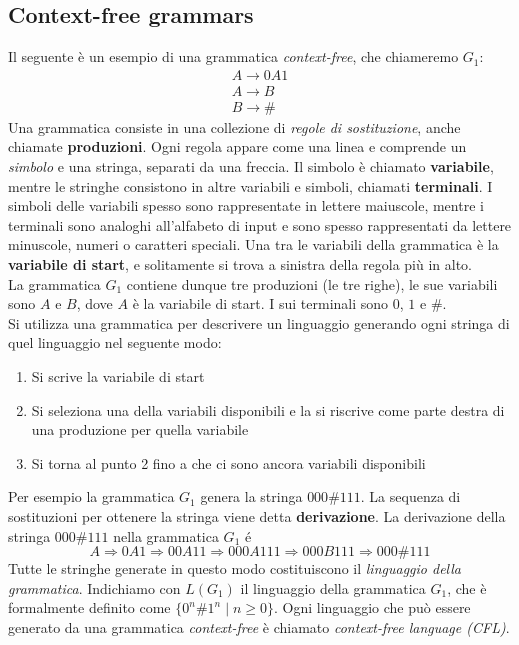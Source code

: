 \documentclass[italian]{article}
\newcommand{\taleche}{\;|\;}
\begin{document}
\subsection{Context-free grammars}
Il seguente è un esempio di una grammatica \textit{context-free}, che chiameremo $G_1$:
\begin{gather*}
	A \to 0A1 \\
	A \to B \\
	B \to \#
\end{gather*}
Una grammatica consiste in una collezione di \textit{regole di sostituzione}, anche chiamate \textbf{produzioni}. Ogni regola appare come una linea e comprende un \textit{simbolo} e una stringa, separati da una freccia. Il simbolo è chiamato \textbf{variabile}, mentre le stringhe consistono in altre variabili e simboli, chiamati \textbf{terminali}. I simboli delle variabili spesso sono rappresentate in lettere maiuscole, mentre i terminali sono analoghi all'alfabeto di input e sono spesso rappresentati da lettere minuscole, numeri o caratteri speciali. Una tra le variabili della grammatica è la \textbf{variabile di start}, e solitamente si trova a sinistra della regola più in alto. \\

\noindent
La grammatica $G_1$ contiene dunque tre produzioni (le tre righe), le sue variabili sono $A$ e $B$, dove $A$ è la variabile di start. I sui terminali sono $0$, $1$ e $\#$. \\

\noindent
Si utilizza una grammatica per descrivere un linguaggio generando ogni stringa di quel linguaggio nel seguente modo:
\begin{enumerate}[itemsep=0pt]
	\item Si scrive la variabile di start
	\item Si seleziona una della variabili disponibili e la si riscrive come parte destra di una produzione per quella variabile
	\item Si torna al punto 2 fino a che ci sono ancora variabili disponibili
\end{enumerate}
Per esempio la grammatica $G_1$ genera la stringa $000\#111$. La sequenza di sostituzioni per ottenere la stringa viene detta \textbf{derivazione}. La derivazione della stringa $000\#111$ nella grammatica $G_1$ é
\[
	A \Rightarrow 0A1  \Rightarrow 00A11 \Rightarrow 000A111 \Rightarrow 000B111 \Rightarrow 000\#111
\]
Tutte le stringhe generate in questo modo costituiscono il \textit{linguaggio della grammatica}. Indichiamo con $L(G_1)$ il linguaggio della grammatica $G_1$, che è formalmente definito come $\{ 0^n\#1^n \taleche n \geq 0 \}$. Ogni linguaggio che può essere generato da una grammatica \textit{context-free} è chiamato \textit{context-free language \nolinebreak (CFL)}.\\
\end{document}
